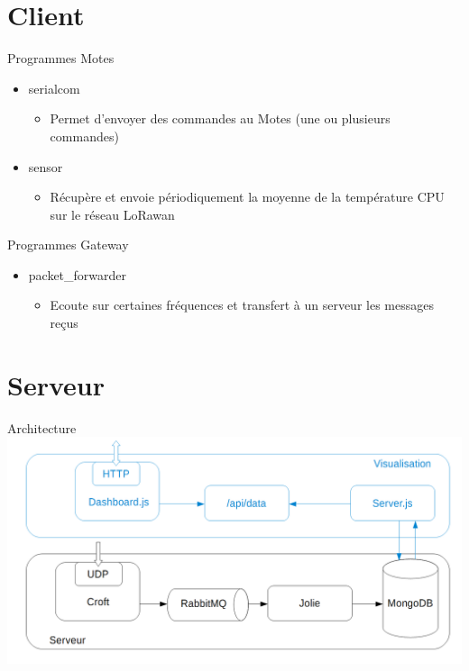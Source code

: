 \documentclass{beamer}
\begin{document}
\section{Client}
\begin{frame}
	\begin{block}{Programmes Motes}
		\begin{itemize}
			\item serialcom
				\begin{itemize}
					\item Permet d'envoyer des commandes au Motes (une ou plusieurs commandes)
				\end{itemize}
			\item sensor
				\begin{itemize}
					\item Récupère et envoie périodiquement la moyenne de la température CPU sur le réseau LoRawan
				\end{itemize}
		\end{itemize}
	\end{block}
\end{frame}

\begin{frame}
	\begin{block}{Programmes Gateway}
		\begin{itemize}
			\item packet\_forwarder
			\begin{itemize}
				\item Ecoute sur certaines fréquences et transfert à un serveur les messages reçus
			\end{itemize}
		\end{itemize}
	\end{block}
\end{frame}

\section{Serveur}
\begin{frame}{Architecture}
	\includegraphics[scale=0.3]{M2M.png}
\end{frame}
\end{document}
